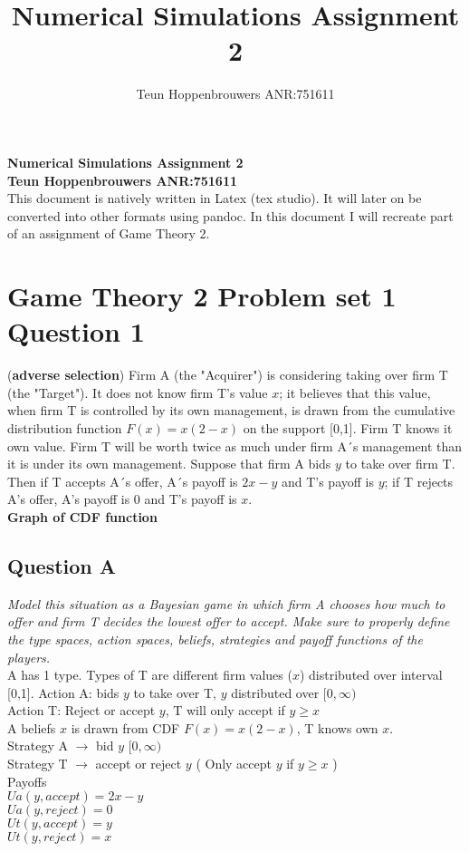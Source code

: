 \documentclass[12pt]{article}
\author{Teun Hoppenbrouwers ANR:751611}
\title{Numerical Simulations Assignment 2}
\begin{document}
\begin{center}
		\textbf{Numerical Simulations Assignment 2 \\
Teun Hoppenbrouwers ANR:751611} \\
\vspace{5mm}
This document is natively written in Latex (tex studio). It will later on be converted into other formats using pandoc. In this document I will recreate part of an assignment of Game Theory 2. \\
\section{Game Theory 2 Problem set 1 Question 1}
(\textbf{adverse selection}) Firm A (the "Acquirer") is considering taking over firm T (the "Target"). It does not know firm T's value $x$; it believes that this value, when firm T is controlled by its own management, is drawn from the cumulative distribution function $F(x)=x(2-x)$ on the support [0,1]. Firm T knows it own value. Firm T will be worth twice as much under firm A´s management than it is under its own management. Suppose that firm A bids $y$ to take over firm T. Then if T accepts A´s offer, A´s payoff is $2x-y$ and T's payoff is $y$; if T rejects A's offer, A's payoff is $0$ and T's payoff is $x$. \\
\vspace{10mm}
\textbf{Graph of CDF function} \\ 
\subsection{Question A}
\textit{Model this situation as a Bayesian game in which firm A chooses how much to offer and firm T decides the lowest offer to accept. Make sure to properly define the type spaces, action spaces, beliefs, strategies and payoff functions of the players.} \\
\vspace{5mm}
A has 1 type. Types of T are different firm values ($x$) distributed over interval [0,1]. Action A: bids $y$ to take over T, $y$ distributed over  $[ 0,\infty )$ \\ 
Action T: Reject or accept $y$, T will only accept if $y\geq x$ \\
A beliefs $x$ is drawn from CDF $F(x)=x(2-x)$, T knows own $x$. \\
Strategy A $\rightarrow$ bid $y$  $[ 0,\infty ) $ \\
Strategy T $\rightarrow$ accept or reject $y$ ( Only accept $y$ if $y\geq x$ ) \\ 
\vspace{5mm}
Payoffs \\
$Ua(y, accept)=2x-y$ \\
$Ua(y, reject)=0$ \\
$Ut(y,accept)=y$ \\
$Ut(y,reject)=x$ \\
\vspace {5mm}

\end{center}
\end{document}
